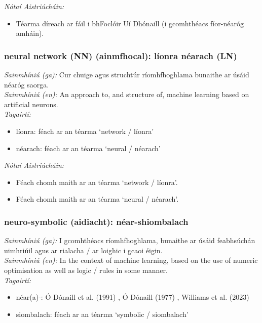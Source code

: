  \noindent \textit{Nótaí Aistriúcháin:}
\begin{itemize}
	\item Téarma díreach ar fáil i bhFoclóir Uí Dhónaill (i gcomhthéacs fíor-néaróg amháin).
\end{itemize}


\subsubsection*{neural network (NN) (ainmfhocal): líonra néarach (LN)}
 \noindent \textit{Sainmhíniú (ga):} Cur chuige agus struchtúr ríomhfhoghlama bunaithe ar úsáid néaróg saorga.
\\
 \noindent \textit{Sainmhíniú (en):} An approach to, and structure of, machine learning based on artificial neurons.
\\
 \noindent \textit{Tagairtí:}
\begin{itemize}
	\item líonra: féach ar an téarma `network / líonra'
	\item néarach: féach ar an téarma `neural / néarach'
\end{itemize}

 \noindent \textit{Nótaí Aistriúcháin:}
\begin{itemize}
	\item Féach chomh maith ar an téarma `network / líonra'.
	\item Féach chomh maith ar an téarma `neural / néarach'.
\end{itemize}


\subsubsection*{neuro-symbolic (aidiacht): néar-shiombalach}
 \noindent \textit{Sainmhíniú (ga):} I gcomhthéacs ríomhfhoghlama, bunaithe ar úsáid feabhsúchán uimhriúil agus ar rialacha / ar loighic i gcaoi éigin.
\\
 \noindent \textit{Sainmhíniú (en):} In the context of machine learning, based on the use of numeric optimisation as well as logic / rules in some manner.
\\
 \noindent \textit{Tagairtí:}
\begin{itemize}
	\item néar(a)-: Ó Dónaill et al. (1991) \cite{focloir-beag}, Ó Dónaill (1977) \cite{odonaill}, Williams et al. (2023) \cite{storchiste}
	\item siombalach: féach ar an téarma `symbolic / siombalach'
\end{itemize}

